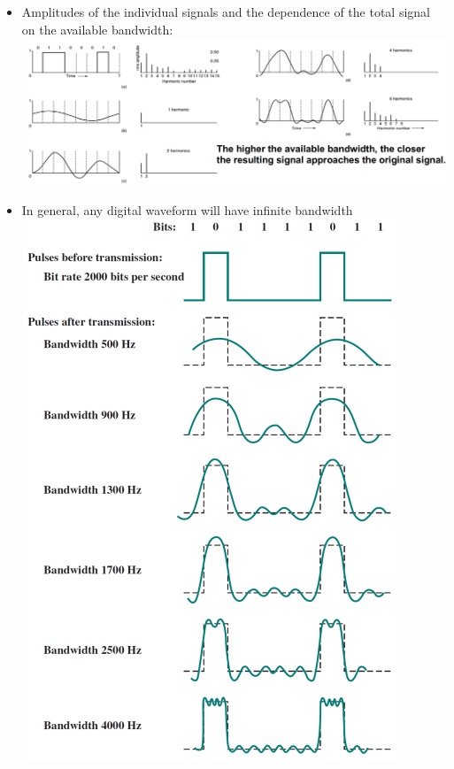 \documentclass[11pt]{article}
\begin{document}
\begin{itemize}
    \item Amplitudes of the individual signals and the dependence of the total signal on the available bandwidth: \\
    \includegraphics[width=\textwidth]{fourier-analysis-4.png}
    \item In general, any digital waveform will have infinite bandwidth \\
    \includegraphics[width=\textwidth]{fourier-analysis-5.png}

\end{itemize}
\end{document}
